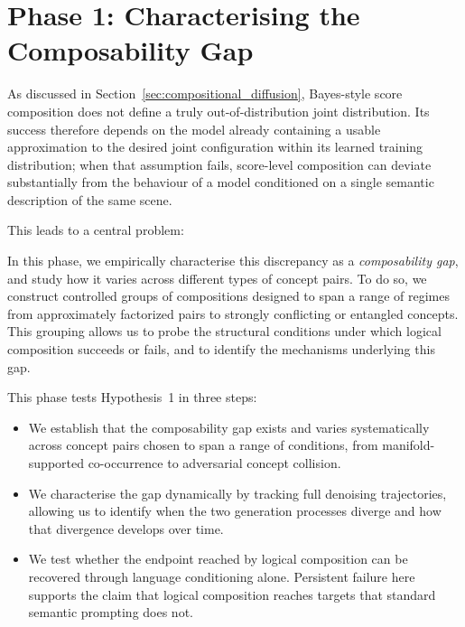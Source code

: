 
\section{Phase 1: Characterising the Composability Gap}
\label{sec:phase_1}

As discussed in Section~\ref{sec:compositional_diffusion}, Bayes-style score composition does not define a truly out-of-distribution joint distribution. Its success therefore depends on the model already containing a usable approximation to the desired joint configuration within its learned training distribution; when that assumption fails, score-level composition can deviate substantially from the behaviour of a model conditioned on a single semantic description of the same scene.

This leads to a central problem:
\begin{center}
{\setlength{\fboxsep}{6pt}%
}
\end{center}


In this phase, we empirically characterise this discrepancy as a \textit{composability gap}, and study how it varies across different types of concept pairs. To do so, we construct controlled groups of compositions designed to span a range of regimes from approximately factorized pairs to strongly conflicting or entangled concepts. This grouping allows us to probe the structural conditions under which logical composition succeeds or fails, and to identify the mechanisms underlying this gap.

This phase tests Hypothesis~1 in three steps:
\begin{itemize}
    \item We establish that the composability gap exists and varies systematically across concept pairs chosen to span a range of conditions, from manifold-supported co-occurrence to adversarial concept collision.
    \item We characterise the gap dynamically by tracking full denoising trajectories, allowing us to identify when the two generation processes diverge and how that divergence develops over time.
    \item We test whether the endpoint reached by logical composition can be recovered through language conditioning alone. Persistent failure here supports the claim that logical composition reaches targets that standard semantic prompting does not.
\end{itemize}

